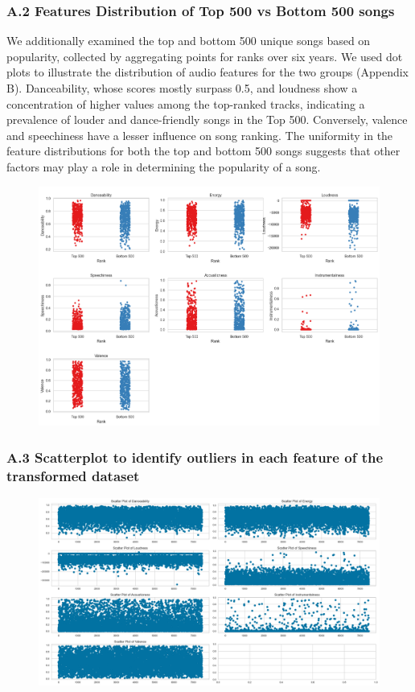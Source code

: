 \documentclass{article}
\begin{document}
\subsubsection*{A.2 Features Distribution of Top 500 vs Bottom 500 songs}

We additionally examined the top and bottom 500 unique songs based on popularity, collected by aggregating points for ranks over six years. We used dot plots to illustrate the distribution of audio features for the two groups (Appendix B). Danceability, whose scores mostly surpass 0.5, and loudness show a concentration of higher values among the top-ranked tracks, indicating a prevalence of louder and dance-friendly songs in the Top 500. Conversely, valence and speechiness have a lesser influence on song ranking. The uniformity in the feature distributions for both the top and bottom 500 songs suggests that other factors may play a role in determining the popularity of a song.

\label{app:FEATURES500}
\begin{figure}[H]
    \centering
    \includegraphics[width=0.8\linewidth]{Images/Features Vs Rank.png}
\end{figure}

\subsubsection*{A.3 Scatterplot to identify outliers in each feature of the transformed dataset}
\label{app:outliers-scatterplot}
\begin{figure}[H]
    \centering
    \includegraphics[width=0.7\linewidth]{Images/scatter plot for outliears.png}
\end{figure}
\end{document}

